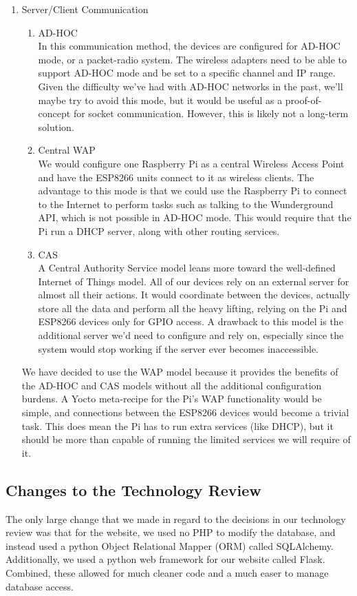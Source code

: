 \begin{enumerate}
    \item Server/Client Communication
        \begin{enumerate}
            \item AD-HOC \\
            In this communication method, the devices are configured for AD-HOC mode, or a packet-radio system. The wireless adapters need to be able to support AD-HOC mode and be set to a specific channel and IP range. Given the difficulty we've had with AD-HOC networks in the past, we'll maybe try to avoid this mode, but it would be useful as a proof-of-concept for socket communication. However, this is likely not a long-term solution.
            \item Central WAP \\
            We would configure one Raspberry Pi as a central Wireless Access Point and have the ESP8266 units connect to it as wireless clients. The advantage to this mode is that we could use the Raspberry Pi to connect to the Internet to perform tasks such as talking to the Wunderground API, which is not possible in AD-HOC mode. This would require that the Pi run a DHCP server, along with other routing services.
            \item CAS \\
            A Central Authority Service model leans more toward the well-defined Internet of Things model. All of our devices rely on an external server for almost all their actions. It would coordinate between the devices, actually store all the data and perform all the heavy lifting, relying on the Pi and ESP8266 devices only for GPIO access. A drawback to this model is the additional server we'd need to configure and rely on, especially since the system would stop working if the server ever becomes inaccessible.
        \end{enumerate}
        We have decided to use the WAP model because it provides the benefits of the AD-HOC and CAS models without all the additional configuration burdens. A Yocto meta-recipe for the Pi's WAP functionality would be simple, and connections between the ESP8266 devices would become a trivial task. This does mean the Pi has to run extra services (like DHCP), but it should be more than capable of running the limited services we will require of it.
\end{enumerate}

\subsection{Changes to the Technology Review}

The only large change that we made in regard to the decisions in our technology review was that for the website, we used no PHP to modify the database, and instead used a python Object Relational Mapper (ORM) called SQLAlchemy. Additionally, we used a python web framework for our website called Flask. Combined, these allowed for much cleaner code and a much easer to manage database access.

